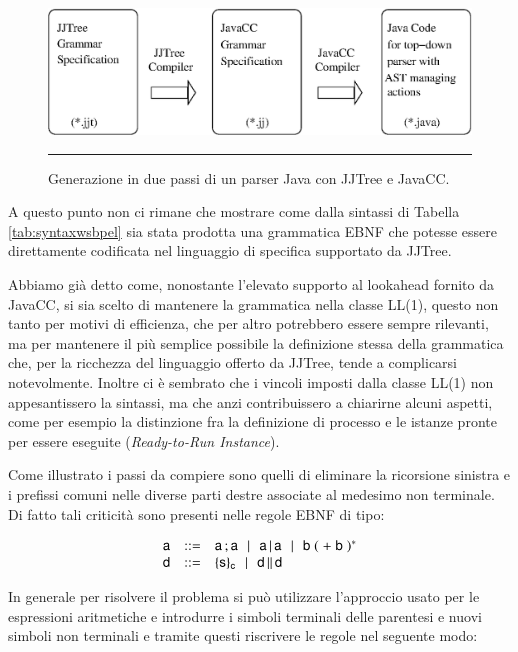 \begin{figure}[!t]
\begin{center}
  \includegraphics[scale=0.95]{linguaggio/dia/jjporc}
   \caption[Un parser con JJTree e JavaCC]{Generazione in due passi di un
   parser Java con JJTree e JavaCC.}
   \rule{7cm}{0.01cm}
  \label{fig:lin:jjproc}
\end{center}
\end{figure}

A questo punto non ci rimane che mostrare come dalla sintassi di Tabella
\ref{tab:syntaxwsbpel} sia stata prodotta una grammatica EBNF che potesse
essere direttamente codificata nel linguaggio di specifica supportato da
JJTree.

Abbiamo già detto come, nonostante l'elevato supporto al lookahead fornito
da JavaCC, si sia scelto di mantenere la grammatica nella classe LL(1), questo
non tanto per motivi di efficienza, che per altro potrebbero essere sempre
rilevanti, ma per mantenere il più semplice possibile la definizione stessa
della grammatica che, per la ricchezza del linguaggio offerto da JJTree, tende
a complicarsi notevolmente. Inoltre ci è sembrato che i vincoli imposti dalla
classe LL(1) non appesantissero la sintassi, ma che anzi contribuissero a
chiarirne alcuni aspetti, come per esempio la distinzione fra la definizione di processo
e le istanze pronte per essere eseguite (\emph{Ready-to-Run Instance}).

Come illustrato i passi da compiere sono quelli di eliminare la ricorsione
sinistra e i prefissi comuni nelle diverse parti destre associate al medesimo
non terminale. Di fatto tali criticità sono presenti nelle regole EBNF di tipo:

$$
\begin{array}{rcl}
\xs & ::= &
\xs \xsucc\xs  
\!\sepgr\! \xs \xpar \xs 
\!\sepgr\! \xb \; ( \; + \; \xb  \; )^*  \\
 
\xd & ::= &  \xeng{\xI}{\xcorr} \!\sepgr\! \xd \, \xspar \xd
\end{array}
$$ 

In generale per risolvere il problema si può utilizzare l'approccio usato per
le espressioni aritmetiche e introdurre i simboli terminali delle parentesi e
nuovi simboli non terminali e tramite questi riscrivere le regole nel
seguente modo:

